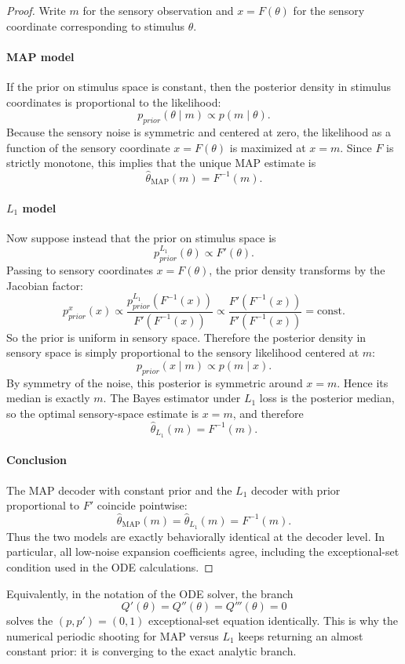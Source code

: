 \documentclass[11pt]{article}
\newcommand{\Prior}{p_{prior}}
\begin{document}
\begin{proof}
Write $m$ for the sensory observation and $x=F(\theta)$ for the sensory coordinate corresponding to stimulus $\theta$.

\paragraph*{MAP model}
If the prior on stimulus space is constant, then the posterior density in stimulus coordinates is proportional to the likelihood:
\[
\Prior(\theta\mid m)\propto p(m\mid \theta).
\]
Because the sensory noise is symmetric and centered at zero, the likelihood as a function of the sensory coordinate $x=F(\theta)$ is maximized at $x=m$. Since $F$ is strictly monotone, this implies that the unique MAP estimate is
\[
\widehat\theta_{\mathrm{MAP}}(m)=F^{-1}(m).
\]

\paragraph*{$L_1$ model}
Now suppose instead that the prior on stimulus space is
\[
\Prior^{L_1}(\theta)\propto F'(\theta).
\]
Passing to sensory coordinates $x=F(\theta)$, the prior density transforms by the Jacobian factor:
\[
\Prior^{x}(x)
\propto
\frac{\Prior^{L_1}(F^{-1}(x))}{F'(F^{-1}(x))}
\propto
\frac{F'(F^{-1}(x))}{F'(F^{-1}(x))}
=
\text{const}.
\]
So the prior is uniform in sensory space. Therefore the posterior density in sensory space is simply proportional to the sensory likelihood centered at $m$:
\[
\Prior(x\mid m)\propto p(m\mid x).
\]
By symmetry of the noise, this posterior is symmetric around $x=m$. Hence its median is exactly $m$. The Bayes estimator under $L_1$ loss is the posterior median, so the optimal sensory-space estimate is $x=m$, and therefore
\[
\widehat\theta_{L_1}(m)=F^{-1}(m).
\]

\paragraph*{Conclusion}
The MAP decoder with constant prior and the $L_1$ decoder with prior proportional to $F'$ coincide pointwise:
\[
\widehat\theta_{\mathrm{MAP}}(m)=\widehat\theta_{L_1}(m)=F^{-1}(m).
\]
Thus the two models are exactly behaviorally identical at the decoder level. In particular, all low-noise expansion coefficients agree, including the exceptional-set condition used in the ODE calculations.
\end{proof}

Equivalently, in the notation of the ODE solver, the branch
\[
Q'(\theta)=Q''(\theta)=Q'''(\theta)=0
\]
solves the $(p,p')=(0,1)$ exceptional-set equation identically. This is why the numerical periodic shooting for MAP versus $L_1$ keeps returning an almost constant prior: it is converging to the exact analytic branch.
\end{document}
